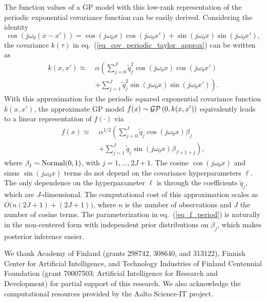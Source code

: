 The function values of a GP model with this low-rank representation of the periodic exponential covariance function can be easily derived. Considering the identity
%
\begin{equation*}
\cos(j\omega_0 (x-x'))=\cos(j\omega_0 x) \cos(j\omega_0 x') + \sin(j\omega_0 x) \sin(j\omega_0 x'),
\end{equation*}
the covariance $k(\tau)$ in eq.~(\ref{eq_cov_periodic_taylor_approx}) can be written as
%
\begin{align} \label{eq_cov_periodic_taylor_approx_2}
k(x,x')\approx \; & \alpha \left( \sum_{j=0}^{J} \tilde{q}_j^2 \cos(j\omega_0 x)  \cos(j\omega_0 x') \right. \nonumber\\
& \left. + \sum_{j=1}^{J} \tilde{q}_j^2 \sin(j\omega_0 x) \sin(j\omega_0 x') \right).
\end{align}
With this approximation for the periodic squared exponential covariance function $k(x,x')$, the approximate GP model $f(x) \sim \operatorname{\mathcal{GP}}\left(0,k(x,x')\right)$ equivalently leads to a linear representation of $f(\cdot)$ via
%
\begin{align} \label{eq_f_period}
f(x) \approx \; & \alpha^{1/2} \left( \sum_{j=0}^J  \tilde{q}_j \cos(j\omega_0 x) \beta_j \right. \nonumber\\
& \left.+  \sum_{j=1}^J \tilde{q}_j \sin(j\omega_0 x) \beta_{J+1+j} \right),
\end{align}
where $\beta_j \sim \operatorname{Normal}(0,1)$, with $j=1,\dots,2J+1$. The cosine $\cos(j\omega_0 x)$ and sinus $\sin(j\omega_0 x)$ terms do not depend on the covariance hyperparameters $\ell$. The only dependence on the hyperparameter $\ell$ is through the coefficients $\tilde{q}_j$, which are $J$-dimensional. The computational cost of this approximation scales as $O\big(n(2J+1) + (2J+1)\big)$, where $n$ is the number of observations and $J$ the number of cosine terms.
The parameterization in eq.~(\ref{eq_f_period}) is naturally in the non-centered form with independent prior distributions on
$\beta_j$, which makes posterior inference easier.




\begin{acknowledgements}
We thank Academy of Finland (grants 298742, 308640, and 313122), Finnish Center for Artificial Intelligence, and Technology Industries of Finland Centennial Foundation (grant 70007503; Artificial Intelligence for Research and Development) for partial support of this research. We also acknowledge the computational resources provided by the Aalto Science-IT project.
\end{acknowledgements}


